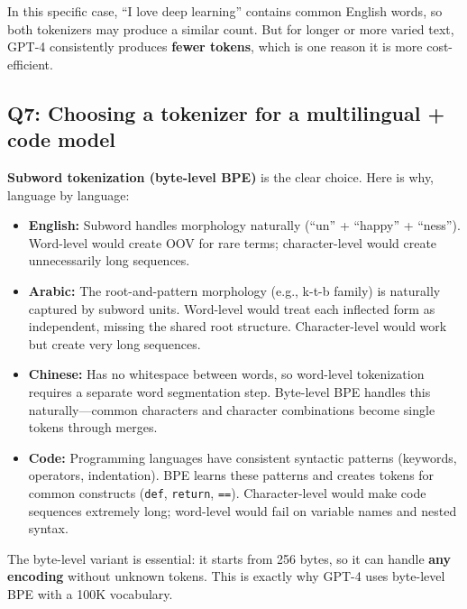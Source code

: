\documentclass[11pt,a4paper]{article}
\begin{document}
In this specific case, ``I love deep learning'' contains common English words, so both tokenizers may produce a similar count. But for longer or more varied text, GPT-4 consistently produces \textbf{fewer tokens}, which is one reason it is more cost-efficient.

\subsection*{Q7: Choosing a tokenizer for a multilingual + code model}

\textbf{Subword tokenization (byte-level BPE)} is the clear choice. Here is why, language by language:

\begin{itemize}[leftmargin=1.5em]
    \item \textbf{English:} Subword handles morphology naturally (``un'' + ``happy'' + ``ness''). Word-level would create OOV for rare terms; character-level would create unnecessarily long sequences.

    \item \textbf{Arabic:} The root-and-pattern morphology (e.g., k-t-b family) is naturally captured by subword units. Word-level would treat each inflected form as independent, missing the shared root structure. Character-level would work but create very long sequences.

    \item \textbf{Chinese:} Has no whitespace between words, so word-level tokenization requires a separate word segmentation step. Byte-level BPE handles this naturally---common characters and character combinations become single tokens through merges.

    \item \textbf{Code:} Programming languages have consistent syntactic patterns (keywords, operators, indentation). BPE learns these patterns and creates tokens for common constructs (\texttt{def}, \texttt{return}, \texttt{==}). Character-level would make code sequences extremely long; word-level would fail on variable names and nested syntax.
\end{itemize}

The byte-level variant is essential: it starts from 256 bytes, so it can handle \textbf{any encoding} without unknown tokens. This is exactly why GPT-4 uses byte-level BPE with a 100K vocabulary.
\end{document}
